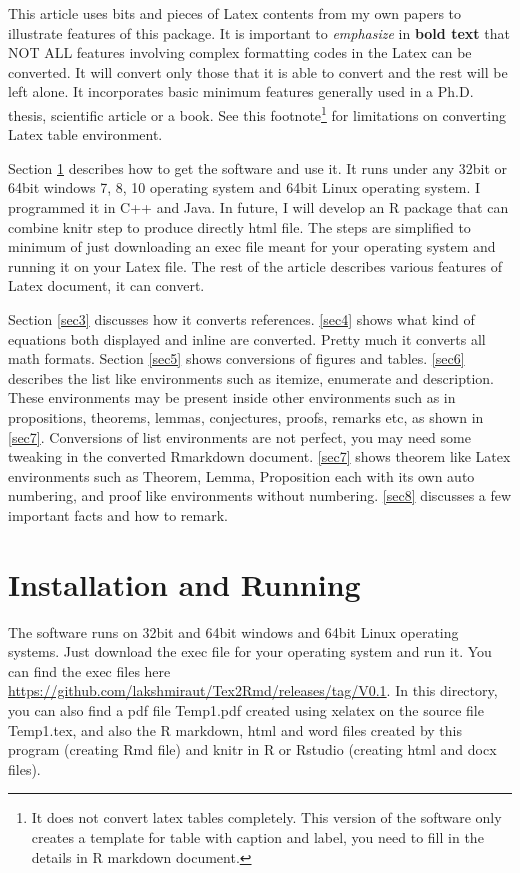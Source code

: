 \documentclass[12pt,svgnames]{article}
\begin{document}
This article uses bits and pieces of Latex contents from my own papers to illustrate features of this package. It is important to \emph{emphasize} in \textbf{bold text} that NOT ALL features involving complex formatting codes in the Latex can be converted. It will convert only those that it is able to convert and the rest will be left alone. It incorporates basic minimum features generally used in a Ph.D. thesis, scientific article or a book. See this footnote\footnote{%
It does not convert latex tables completely. This version of the software only creates a template for table with caption and label, you need to fill in the details in R markdown document.} for limitations on converting Latex table environment.

Section \ref{sec2} describes how to get the software and use it. It runs under any 32bit or 64bit windows 7, 8, 10 operating system and 64bit Linux operating system. I programmed it in C++ and Java. In future, I will develop an R package that can combine knitr step to produce directly html file.  The steps are simplified to minimum of just downloading an exec file meant for your operating system and running it on your Latex file. The rest of the article describes various features of Latex document, it can convert. 
 
Section \ref{sec3} discusses how it converts references. \autoref{sec4} shows what kind of equations both displayed and inline are converted. Pretty much it converts all math formats. Section \ref{sec5} shows conversions of figures and tables. \autoref{sec6} describes the list like environments such as itemize, enumerate and description. These environments may be present inside other environments such as in propositions, theorems, lemmas, conjectures, proofs, remarks etc, as shown in \autoref{sec7}. Conversions of list environments are not perfect, you may need some tweaking in the converted Rmarkdown document. \autoref{sec7} shows theorem like Latex environments such as Theorem, Lemma, Proposition each with its own auto numbering, and proof like environments without numbering. \autoref{sec8} discusses a few important facts and how to remark.

\section{Installation and Running}\label{sec2}
The software runs on 32bit and 64bit windows and 64bit Linux operating systems.  Just download the exec file for your operating system and run it. You can find the exec files here \url{https://github.com/lakshmiraut/Tex2Rmd/releases/tag/V0.1}. In this directory, you can also find a pdf file Temp1.pdf created using xelatex on the source file Temp1.tex, and also the R markdown, html and word files created by this program (creating Rmd file) and knitr in R or Rstudio (creating html and docx files).
\end{document}

